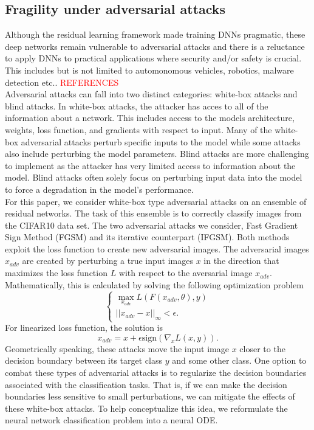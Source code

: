 \documentclass[12pt]{article}
\begin{document}
\subsection{Fragility under adversarial attacks}
Although the residual learning framework made training DNNs pragmatic, these deep networks remain vulnerable to adversarial attacks and there is a reluctance to apply DNNs to practical applications where security and/or safety is crucial. This includes but is not limited to automonomous vehicles, robotics, malware detection etc.. \textcolor{red}{REFERENCES} \\
Adversarial attacks can fall into two distinct categories: white-box attacks and blind attacks. In white-box attacks, the attacker has acces to all of the information about a network. This includes access to the models architecture, weights, loss function, and gradients with respect to input. Many of the white-box adversarial attacks perturb specific inputs to the model while some attacks also include perturbing the model parameters. Blind attacks are more challenging to implement as the attacker has very limited access to information about the model. Blind attacks often solely focus on perturbing input data into the model to force a degradation in the model's performance. \\
For this paper, we consider white-box type adversarial attacks on an ensemble of residual networks. The task of this ensemble is to correctly classify images from the CIFAR10 data set. The two adversarial attacks we consider, Fast Gradient Sign Method (FGSM) and its iterative counterpart (IFGSM). Both methods exploit the loss function to create new adversarial images. The adversarial images $x_{adv}$ are created by perturbing a true input images $x$ in the direction that maximizes the loss function $L$ with respect to the aversarial image $x_{adv}$. Mathematically, this is calculated by solving the following optimization problem
\begin{equation}
  \begin{cases} \max\limits_{x_{adv}} L(F(x_{adv}, \theta),y) \\
   || x_{adv} - x ||_{\infty} < \epsilon.
  \end{cases}
  \label{eq:opt}
\end{equation}
For linearized loss function, the solution is
\begin{equation}
x_{adv} = x + \epsilon\text{sign}(\nabla_x L(x,y)).
  \label{eq:FGSM}
\end{equation}
Geometrically speaking, these attacks move the input image $x$ closer to the decision boundary between its target class $y$ and some other class. One option to combat these types of adversarial attacks is to regularize the decision boundaries associated with the classification tasks. That is, if we can make the decision boundaries less sensitive to small perturbations, we can mitigate the effects of these white-box attacks. To help conceptualize this idea, we reformulate the neural network classification problem into a neural ODE.
\end{document}
